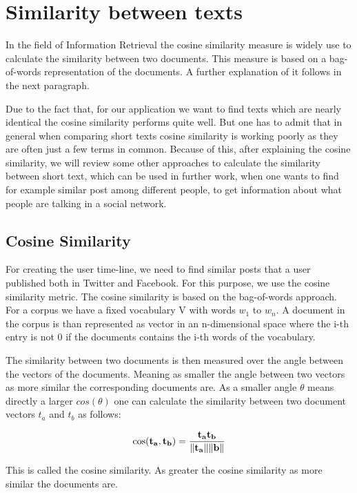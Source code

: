 \section{Similarity between  texts}

In the field of Information Retrieval the cosine similarity measure is widely use to calculate the similarity between two documents. This measure is based on a bag-of-words representation of the documents. A further explanation of it follows in the next paragraph.


Due to the fact that, for our application we want to find texts which are nearly identical the cosine similarity performs quite well. But one has to admit that in general when comparing short texts cosine similarity is working poorly as they are often just a few terms in common. Because of this, after explaining the cosine similarity, we will review some other approaches to calculate the similarity between short text, which can be used in further work, when one wants to find  for example similar post among different people, to get information about what people are talking in a social network. 

\subsection{Cosine Similarity}

For creating the user time-line, we need to find similar posts that a user published both in Twitter and Facebook. For this purpose, we use the cosine similarity metric. The cosine similarity is based on the bag-of-words approach. For a corpus we have a fixed vocabulary V with words $w_1$ to $w_n$. A document in the corpus is than represented as vector in an n-dimensional space where the i-th entry is  not 0 if the documents contains the i-th words of the vocabulary.


The similarity between two documents is then measured over the angle between the vectors of the documents. Meaning as smaller the angle between two vectors as more similar the corresponding documents are. As a smaller angle $\theta$ means directly a larger $cos(\theta)$ one can calculate the similarity between two document vectors  $t_{a}$ and $t_{b}$ as follows:

\begin{equation}
\cos ({\bf t_{a}},{\bf t_{b}})= {{\bf t_{a}} {\bf t_{b}} \over \|{\bf t_{a}}\| \|{\bf \textbf{b}}\|} 
\end{equation}

This is called the cosine similarity. As greater the cosine similarity as more similar the documents are.



